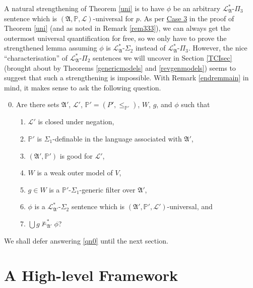 \documentclass[12pt, twoside]{memoir}
\numberwithin{equation}{section}
\theoremstyle{definition}
\theoremstyle{remark}
\theoremstyle{definition}
\theoremstyle{definition}
\theoremstyle{definition}
\theoremstyle{remark}
\begin{document}
A natural strengthening of Theorem \ref{uni} is to have $\phi$ be an arbitrary $\mathcal{L}^{*}_{\mathfrak{A}}$-$\Pi_3$ sentence which is $(\mathfrak{A}, \mathbb{P}, \mathcal{L})$-universal for $p$. As per \hyperref[526c3]{Case 3} in the proof of Theorem \ref{uni} (and as noted in Remark \ref{rem333}), we can always get the outermost universal quantification for free, so we only have to prove the strengthened lemma assuming $\phi$ is $\mathcal{L}^{*}_{\mathfrak{A}}$-$\Sigma_2$ instead of $\mathcal{L}^{*}_{\mathfrak{A}}$-$\Pi_3$. However, the nice ``characterisation'' of $\mathcal{L}^{*}_{\mathfrak{A}}$-$\Pi_2$ sentences we will uncover in Section \ref{TCIsec} (brought about by Theorems \ref{genericmodels} and \ref{revgenmodels}) seems to suggest that such a strengthening is impossible. With Remark \ref{endremmain} in mind, it makes sense to ask the following question.

\begin{enumerate}[label=(Q\arabic*)]
    \setcounter{enumi}{-1}
    \item\label{qn0} Are there sets $\mathfrak{A}'$, $\mathcal{L}'$, $\mathbb{P}' = (P', \leq_{\mathbb{P}'})$, $W$, $g$, and $\phi$ such that
    \begin{enumerate}[label=(\alph*)]
        \item $\mathcal{L}'$ is closed under negation,
        \item $\mathbb{P}'$ is $\Sigma_1$-definable in the language associated with $\mathfrak{A}'$,
        \item $(\mathfrak{A}', \mathbb{P}')$ is good for $\mathcal{L}'$,
        \item $W$ is a weak outer model of $V$,
        \item $g \in W$ is a $\mathbb{P}'$-$\Sigma_1$-generic filter over $\mathfrak{A}'$,
        \item $\phi$ is a $\mathcal{L}^{*}_{\mathfrak{A}'}$-$\Sigma_2$ sentence which is $(\mathfrak{A}', \mathbb{P}', \mathcal{L}')$-universal, and
        \item $\bigcup g \not \models^{*}_{\mathfrak{A}'} \phi$?
    \end{enumerate}
\end{enumerate}

We shall defer answering \ref{qn0} until the next section. 

\section{A High-level Framework}\label{forframe}
\end{document}
